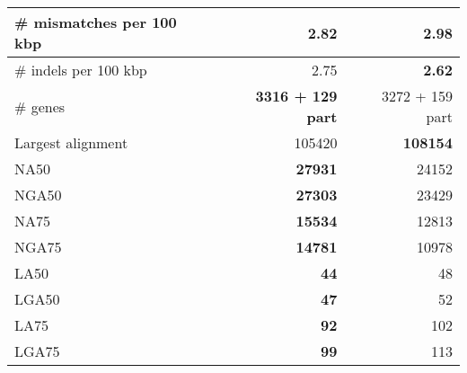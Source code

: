 \documentclass[12pt,a4paper]{article}
\begin{document}
\begin{table}[ht]
\begin{center}
\begin{tabular}{|l*{2}{|r}|}
\# mismatches per 100 kbp & {\bf 2.82} & 2.98 \\ \hline
\# indels per 100 kbp & 2.75 & {\bf 2.62} \\ \hline
\# genes & {\bf 3316 + 129 part} & 3272 + 159 part \\ \hline
Largest alignment & 105420 & {\bf 108154} \\ \hline
NA50 & {\bf 27931} & 24152 \\ \hline
NGA50 & {\bf 27303} & 23429 \\ \hline
NA75 & {\bf 15534} & 12813 \\ \hline
NGA75 & {\bf 14781} & 10978 \\ \hline
LA50 & {\bf 44} & 48 \\ \hline
LGA50 & {\bf 47} & 52 \\ \hline
LA75 & {\bf 92} & 102 \\ \hline
LGA75 & {\bf 99} & 113 \\ \hline
\end{tabular}
\end{center}
\end{table}
\end{document}
